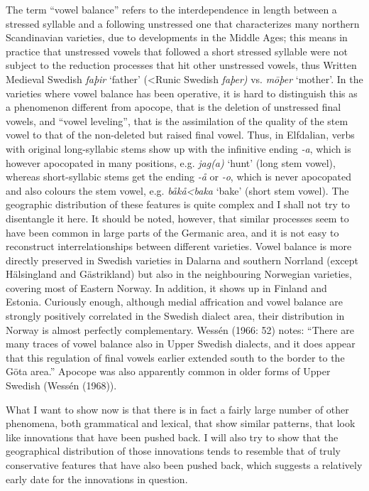 \begin{styleBodytextC}
The term “vowel balance” refers to the interdependence in length between a stressed syllable and a following unstressed one that characterizes many northern Scandinavian varieties, due to developments in the Middle Ages; this means in practice that unstressed vowels that followed a short stressed syllable were not subject to the reduction processes that hit other unstressed vowels, thus Written Medieval Swedish \textit{faþir }‘father’ ({\textless}Runic Swedish\textit{ faþer)} vs. \textit{m\=oþer} ‘mother’.  In the varieties where vowel balance has been operative, it is hard to distinguish this as a phenomenon different from apocope, that is the deletion of unstressed final vowels, and “vowel leveling”, that is the assimilation of the quality of the stem vowel to that of the non-deleted but raised final vowel. Thus, in Elfdalian, verbs with original long-syllabic stems show up with the infinitive ending\textit{ -a}, which is however apocopated in many positions, e.g. \textit{jag(a)} ‘hunt’ (long stem vowel), whereas short-syllabic stems get the ending\textit{ -å} or\textit{ -o}, which is never apocopated and also colours the stem vowel, e.g. \textit{båkå{\textless}baka} ‘bake’ (short stem vowel). The geographic distribution of these features is quite complex and I shall not try to disentangle it here. It should be noted, however, that similar processes seem to have been common in large parts of the Germanic area, and it is not easy to reconstruct interrelationships between different varieties. Vowel balance is more directly preserved in Swedish varieties in Dalarna and southern Norrland (except Hälsingland and Gästrikland) but also in the neighbouring Norwegian varieties, covering most of Eastern Norway. In addition, it shows up in Finland and Estonia. Curiously enough, although medial affrication and vowel balance are strongly positively correlated in the Swedish dialect area, their distribution in Norway is almost perfectly complementary. Wessén (1966: 52) notes: “There are many traces of vowel balance also in Upper Swedish dialects, and it does appear that this regulation of final vowels earlier extended south to the border to the Göta area.” Apocope was also apparently common in older forms of Upper Swedish (Wessén (1968)).

\end{styleBodytextC}

\begin{styleBodytextC}
What I want to show now is that there is in fact a fairly large number of other phenomena, both grammatical and lexical, that show similar patterns, that look like innovations that have been pushed back. I will also try to show that the geographical distribution of those innovations tends to resemble that of truly conservative features that have also been pushed back, which suggests a relatively early date for the innovations in question.

\end{styleBodytextC}

